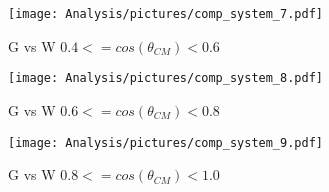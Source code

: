 \begin{figure}[htb]
  \begin{center}
    \texttt{[image: Analysis/pictures/comp\_system\_7.pdf]} \\
    \caption{G vs W $ 0.4 <= cos(\theta_{CM})<0.6$ }
    \label{fig:GvsW_theta8}
  \end{center}
\end{figure}
\begin{figure}[htb]
  \begin{center}
    \texttt{[image: Analysis/pictures/comp\_system\_8.pdf]} \\
    \caption{G vs W $ 0.6 <= cos(\theta_{CM})<0.8$ }
    \label{fig:GvsW_theta9}
  \end{center}
\end{figure}
\begin{figure}[htb]
  \begin{center}
    \texttt{[image: Analysis/pictures/comp\_system\_9.pdf]} \\
    \caption{G vs W $ 0.8 <= cos(\theta_{CM})<1.0$ }
    \label{fig:GvsW_theta10}
  \end{center}
\end{figure}






